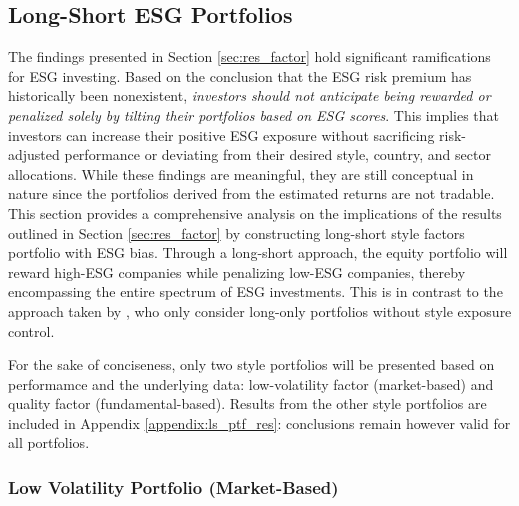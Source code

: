 \documentclass[11pt,a4paper]{article}
\begin{document}
\clearpage

\subsection{Long-Short ESG Portfolios}\label{sec:res_lsptf}

The findings presented in Section \ref{sec:res_factor} hold significant ramifications for ESG investing. 
Based on the conclusion that the ESG risk premium has historically been nonexistent, \textit{investors should not anticipate being rewarded or penalized solely by tilting their portfolios based on ESG scores}.
This implies that investors can increase their positive ESG exposure without sacrificing risk-adjusted performance or deviating from their desired style, country, and sector allocations.
While these findings are meaningful, they are still conceptual in nature since the portfolios derived from the estimated returns are not tradable.
This section provides a comprehensive analysis on the implications of the results outlined in Section \ref{sec:res_factor} by constructing long-short style factors portfolio with ESG bias.
Through a long-short approach, the equity portfolio will reward high-ESG companies while penalizing low-ESG companies, thereby encompassing the entire spectrum of ESG investments. This is in contrast to the approach taken by , who only consider long-only portfolios without style exposure control.

For the sake of conciseness, only two style portfolios will be presented based on performamce and the underlying data: low-volatility factor (market-based) and quality factor (fundamental-based).   
Results from the other style portfolios are included in Appendix \ref{appendix:ls_ptf_res}: conclusions remain however valid for all portfolios. 

\subsubsection{Low Volatility Portfolio (Market-Based)}
\end{document}
